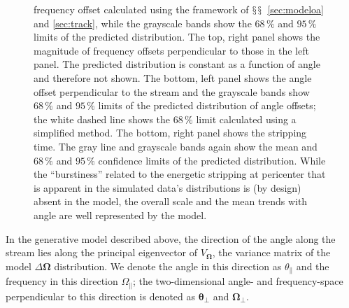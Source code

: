 \documentclass[12pt,preprint]{aastex}
\newcommand{\sectionname}{$\mathsection$}
\renewcommand{\vec}[1]{\ensuremath{\mathbf{#1}}}
\newcommand{\veco}{\ensuremath{\vec{\Omega}}}
\newcommand{\veca}{\ensuremath{\boldsymbol\theta}}
\newcommand{\apar}{\ensuremath{\theta_\parallel}}
\newcommand{\opar}{\ensuremath{\Omega_\parallel}}
\newcommand{\aperp}{\ensuremath{\veca_\perp}}
\newcommand{\operp}{\ensuremath{\veco_\perp}}
\begin{document}
\begin{figure}[t!]
{    frequency offset calculated using the framework of
    \sectionname\sectionname~\ref{sec:modeloa} and \ref{sec:track},
    while the grayscale bands show the $68\,\%$ and $95\,\%$ limits of
    the predicted distribution. The top, right panel shows the
    magnitude of frequency offsets perpendicular to those in the left
    panel. The predicted distribution is constant as a function of
    angle and therefore not shown. The bottom, left panel shows the
    angle offset perpendicular to the stream and the grayscale bands
    show $68\,\%$ and $95\,\%$ limits of the predicted distribution of
    angle offsets; the white dashed line shows the $68\,\%$ limit
    calculated using a simplified method. The bottom, right panel
    shows the stripping time. The gray line and grayscale bands again
    show the mean and $68\,\%$ and $95\,\%$ confidence limits of the
    predicted distribution. While the ``burstiness'' related to the
    energetic stripping at pericenter that is apparent in the
    simulated data's distributions is (by design) absent in the model,
    the overall scale and the mean trends with angle are well
    represented by the model.}\label{fig:gd1_apar}
\end{figure}

In the generative model described above, the direction of the angle
along the stream lies along the principal eigenvector of $V_\veco$,
the variance matrix of the model $\Delta \veco$ distribution. We
denote the angle in this direction as $\apar$ and the frequency in
this direction $\opar$; the two-dimensional angle- and frequency-space
perpendicular to this direction is denoted as $\aperp$ and $\operp$.
\end{document}
